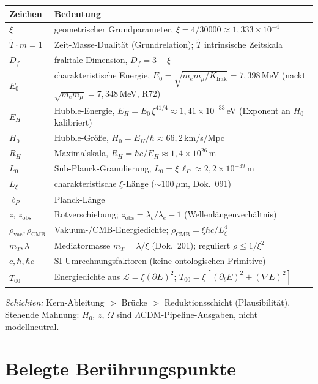 \noindent
\begin{tabular}{@{}ll@{}}
\toprule
Zeichen & Bedeutung \\
\midrule
$\xi$ & geometrischer Grundparameter, $\xi = 4/30000 \approx 1{,}333\times10^{-4}$ \\
$\tilde T\cdot m=1$ & Zeit-Masse-Dualität (Grundrelation); $\tilde T$ intrinsische Zeitskala \\
$D_f$ & fraktale Dimension, $D_f = 3-\xi$ \\
$E_0$ & charakteristische Energie, $E_0=\sqrt{m_e m_\mu/K_{\text{frak}}}=7{,}398$\,MeV (nackt $\sqrt{m_e m_\mu}=7{,}348$\,MeV, R72) \\
$E_H$ & Hubble-Energie, $E_H = E_0\,\xi^{41/4} \approx 1{,}41\times10^{-33}$\,eV (Exponent an $H_0$ kalibriert) \\
$H_0$ & Hubble-Größe, $H_0 = E_H/\hbar \approx 66{,}2$\,km/s/Mpc \\
$R_H$ & Maximalskala, $R_H = \hbar c/E_H \approx 1{,}4\times10^{26}$\,m \\
$L_0$ & Sub-Planck-Granulierung, $L_0 = \xi\,\ell_P \approx 2{,}2\times10^{-39}$\,m \\
$L_\xi$ & charakteristische $\xi$-Länge ($\sim 100\,\mu$m, Dok.~091) \\
$\ell_P$ & Planck-Länge \\
$z,\,z_{\text{obs}}$ & Rotverschiebung; $z_{\text{obs}}=\lambda_b/\lambda_e-1$ (Wellenlängenverhältnis) \\
$\rho_{\text{vac}},\rho_{\text{CMB}}$ & Vakuum-/CMB-Energiedichte; $\rho_{\text{CMB}}=\xi\hbar c/L_\xi^4$ \\
$m_T,\lambda$ & Mediatormasse $m_T=\lambda/\xi$ (Dok.~201); reguliert $\rho\le 1/\xi^2$ \\
$c,\hbar,\hbar c$ & SI-Umrechnungsfaktoren (keine ontologischen Primitive) \\
$T_{00}$ & Energiedichte aus $\mathcal{L}=\xi(\partial E)^2$; $T_{00}=\xi[(\partial_t E)^2+(\nabla E)^2]$ \\
\bottomrule
\end{tabular}

\medskip
\noindent\emph{Schichten:} Kern-Ableitung $>$ Brücke $>$ Reduktionsschicht
(Plausibilität). Stehende Mahnung: $H_0$, $z$, $\Omega$ sind
$\Lambda$CDM-Pipeline-Ausgaben, nicht modellneutral.

\section{Belegte Berührungspunkte}
\label{sec:263-belegt}

